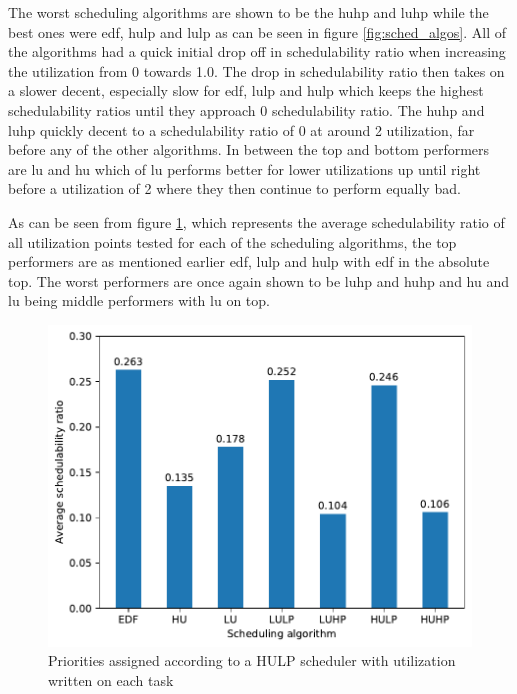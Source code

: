 \documentclass{kththesis}
\begin{document}
The worst scheduling algorithms are shown to be the \acrshort{huhp} and \acrshort{luhp} while the
best ones were \acrshort{edf}, \acrshort{hulp} and \acrshort{lulp} as can be seen in figure
\ref{fig:sched_algos}. All of the algorithms had a quick initial drop off in schedulability ratio
when increasing the utilization from 0 towards 1.0. The drop in schedulability ratio then takes on a
slower decent, especially slow for \acrshort{edf}, \acrshort{lulp} and \acrshort{hulp} which keeps
the highest schedulability ratios until they approach 0 schedulability ratio. The \acrshort{huhp}
and \acrshort{luhp} quickly decent to a schedulability ratio of 0 at around 2 utilization, far
before any of the other algorithms. In between the top and bottom performers are \acrshort{lu} and
\acrshort{hu} which of \acrshort{lu} performs better for lower utilizations up until right before a
utilization of 2 where they then continue to perform equally bad.

As can be seen from figure \ref{fig:sched_algos_averages}, which represents the average
schedulability ratio of all utilization points tested for each of the scheduling algorithms, the top
performers are as mentioned earlier \acrshort{edf}, \acrshort{lulp} and \acrshort{hulp} with
\acrshort{edf} in the absolute top. The worst performers are once again shown to be \acrshort{luhp}
and \acrshort{huhp} and \acrshort{hu} and \acrshort{lu} being middle performers with \acrshort{lu}
on top.

\begin{figure}[H]

    \centering

    \includegraphics[width=1.0\linewidth]{images/sched_algos_averages.pdf}

    \caption{Priorities assigned according to a HULP scheduler with utilization written on each task}

    \label{fig:sched_algos_averages}

\end{figure}
\end{document}

